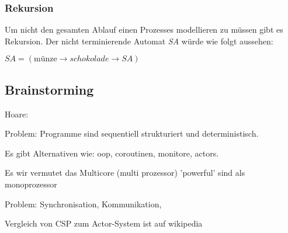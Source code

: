 \subsubsection{Rekursion}
Um nicht den gesamten Ablauf einen Prozesses modellieren zu müssen gibt es Rekursion. Der nicht terminierende Automat \textit{SA} würde wie folgt aussehen:
\begin{addmargin}[1cm]{0cm}
$SA = (\text{münze} \rightarrow schokolade \rightarrow SA)$
\end{addmargin}

\subsection{Brainstorming}

Hoare:

Problem:
Programme sind sequentiell strukturiert und deterministisch.

Es gibt Alternativen wie: oop, coroutinen, monitore, actors.

Es wir vermutet das Multicore (multi prozessor) 'powerful' sind als monoprozessor

Problem: Synchronisation, Kommunikation,

Vergleich von CSP zum Actor-System ist auf wikipedia


